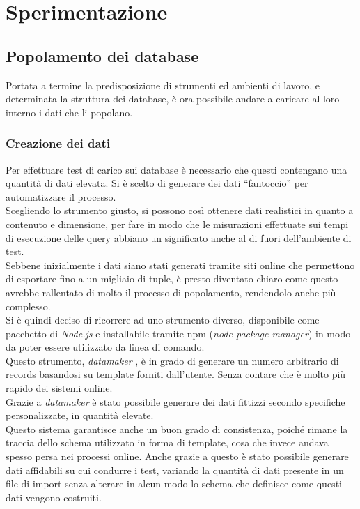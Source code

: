 
\chapter{Sperimentazione}
\label{cap:sperimentazione}
\section{Popolamento dei database}

Portata a termine la predisposizione di strumenti ed ambienti di lavoro, e determinata la struttura dei database, è ora possibile andare a caricare al loro interno i dati che li popolano.\\

\subsection{Creazione dei dati}
Per effettuare test di carico sui database è necessario che questi contengano una quantità di dati elevata. Si è scelto di generare dei dati ``fantoccio'' per automatizzare il processo.\\
Scegliendo lo strumento giusto, si possono così ottenere dati realistici in quanto a contenuto e dimensione, per fare in modo che le misurazioni effettuate sui tempi di esecuzione delle query abbiano un significato anche al di fuori dell'ambiente di test.\\
Sebbene inizialmente i dati siano stati generati tramite siti online che permettono di esportare fino a un migliaio di tuple, è presto diventato chiaro come questo avrebbe rallentato di molto il processo di popolamento, rendendolo anche più complesso.\\

\noindent Si è quindi deciso di ricorrere ad uno strumento diverso, disponibile come pacchetto di \textit{Node.js} e installabile tramite \gls{npm} (\textit{node package manager}) in modo da poter essere utilizzato da linea di comando.\\
Questo strumento, \textit{datamaker} \cite{site:datamaker}, è in grado di generare un numero arbitrario di records basandosi su template forniti dall'utente. Senza contare che è molto più rapido dei sistemi online.\\
Grazie a \textit{datamaker} è stato possibile generare dei dati fittizzi secondo specifiche personalizzate, in quantità elevate.\\
Questo sistema garantisce anche un buon grado di consistenza, poiché rimane la traccia dello schema utilizzato in forma di template, cosa che invece andava spesso persa nei processi online. Anche grazie a questo è stato possibile generare dati affidabili su cui condurre i test, variando la quantità di dati presente in un file di import senza alterare in alcun modo lo schema che definisce come questi dati vengono costruiti.\\


